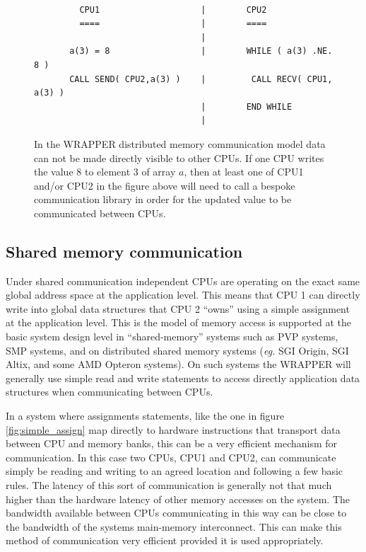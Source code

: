 \begin{figure}
\begin{verbatim}

         CPU1                    |        CPU2
         ====                    |        ====
                                 |
       a(3) = 8                  |        WHILE ( a(3) .NE. 8 )
       CALL SEND( CPU2,a(3) )    |         CALL RECV( CPU1, a(3) )
                                 |        END WHILE
                                 |
\end{verbatim}
\caption{ In the WRAPPER distributed memory communication model
data can not be made directly visible to other CPUs.
If one CPU writes the value $8$ to element $3$ of array $a$, then
at least one of CPU1 and/or CPU2 in the figure above will need
to call a bespoke communication library in order for the updated 
value to be communicated between CPUs.
} \label{fig:comm_msg}
\end{figure}

\subsection{Shared memory communication}
\label{sect:shared_memory_communication}

Under shared communication independent CPUs are operating on the
exact same global address space at the application level.  This means
that CPU 1 can directly write into global data structures that CPU 2
``owns'' using a simple assignment at the application level.  This is
the model of memory access is supported at the basic system design
level in ``shared-memory'' systems such as PVP systems, SMP systems,
and on distributed shared memory systems (\textit{eg.} SGI Origin, SGI
Altix, and some AMD Opteron systems).  On such systems the WRAPPER
will generally use simple read and write statements to access directly
application data structures when communicating between CPUs.

In a system where assignments statements, like the one in figure
\ref{fig:simple_assign} map directly to hardware instructions that
transport data between CPU and memory banks, this can be a very
efficient mechanism for communication.  In this case two CPUs, CPU1
and CPU2, can communicate simply be reading and writing to an agreed
location and following a few basic rules.  The latency of this sort of
communication is generally not that much higher than the hardware
latency of other memory accesses on the system. The bandwidth
available between CPUs communicating in this way can be close to the
bandwidth of the systems main-memory interconnect.  This can make this
method of communication very efficient provided it is used
appropriately.


